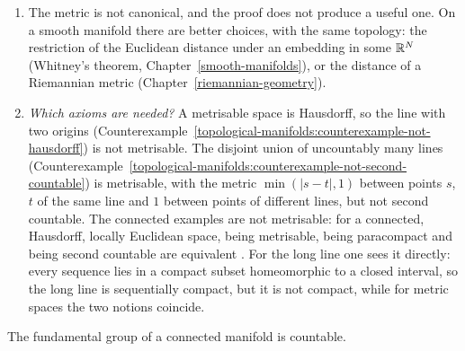 \begin{remark}\label{topological-manifolds:remark-metrisable}
\begin{enumerate}
\item The metric is not canonical, and the proof does not produce a useful one. On a smooth manifold there are better choices, with the same topology: the restriction of the Euclidean distance under an
embedding in some $\mathbb{R}^N$ (Whitney's theorem, Chapter~\ref{smooth-manifolds}), or the distance of a Riemannian metric (Chapter~\ref{riemannian-geometry}).
\item \emph{Which axioms are needed?} A metrisable space is Hausdorff, so the line with two origins (Counterexample~\ref{topological-manifolds:counterexample-not-hausdorff}) is not metrisable. The
disjoint union of uncountably many lines (Counterexample~\ref{topological-manifolds:counterexample-not-second-countable}) is metrisable, with the metric $\min(|s - t|, 1)$ between points $s$, $t$ of the same line and $1$ between points of different
lines, but not second countable. The connected examples are not metrisable: for a connected, Hausdorff, locally Euclidean space, being metrisable, being paracompact and being second countable are equivalent
\cite[Appendix A]{spivak-comprehensive-1}. For the long line one sees it directly: every sequence lies in a compact subset homeomorphic to a closed interval, so the long line is sequentially compact, but it is not compact,
while for metric spaces the two notions coincide.
\end{enumerate}
\end{remark}

\begin{theorem}\label{topological-manifolds:theorem-countable-fundamental-group}
The fundamental group of a connected manifold is countable.
\end{theorem}

